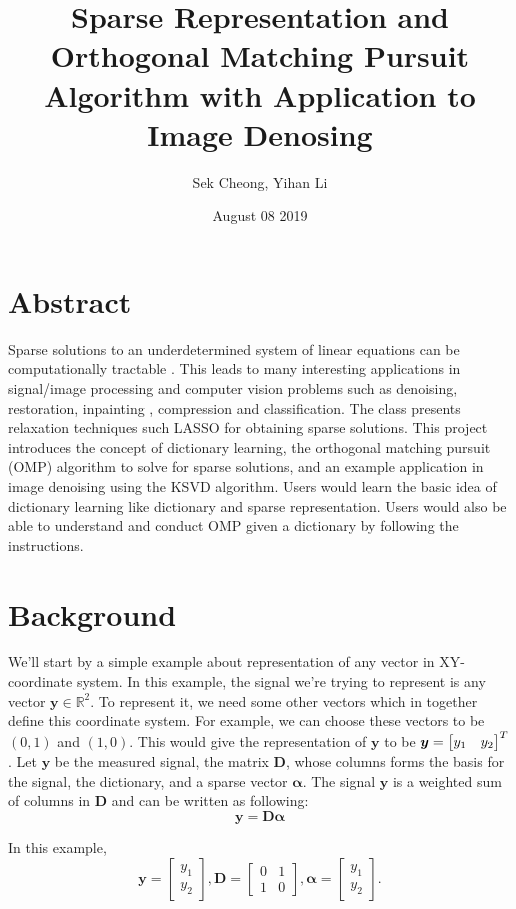\documentclass[12pt,letterpaper]{article}
\title{Sparse Representation and Orthogonal Matching Pursuit Algorithm with Application to Image Denosing}
\author{Sek Cheong, Yihan Li}
\date{August 08 2019}
\begin{document}
\maketitle

\section*{Abstract}
Sparse solutions to an underdetermined system of linear equations can be computationally tractable \cite{Elad2010SparseModeling}. This leads to many interesting applications in signal/image processing and computer vision problems such as denoising\cite{EladAharon2006}, restoration, inpainting \cite{ShenHu2009}, compression and classification. The class presents relaxation techniques such LASSO for obtaining sparse solutions. This project introduces the concept of dictionary learning, the orthogonal matching pursuit (OMP) algorithm to solve for sparse solutions, and an example application in image denoising using the KSVD algorithm. Users would learn the basic idea of dictionary learning like dictionary and sparse representation. Users would also be able to understand and conduct OMP given a dictionary by following the instructions. 
\pagebreak
\section*{Background}
We'll start by a simple example about representation of any vector in XY-coordinate system. In this example, the signal we're trying to represent is any vector $\bm{y}\in\mathbb{R}^2$. To represent it, we need some other vectors which in together define this coordinate system. For example, we can choose these vectors to be $(0,1)$ and $(1,0)$. This would give the representation of $\bm{y}$ to be
$\bm{y}=\mqty[ 
y_1 & y_2]^T$. Let $\bm{y}$ be the measured signal, the matrix $\bm{D}$, whose columns  forms the basis for the signal, the dictionary, and a sparse vector $\bm{\alpha}$. The signal $\bm{y}$ is a weighted sum of columns in $\bm{D}$ and can be written as following:
\[
    \bm{y} = \bm{D}\bm{\alpha} 
\]

In this example, 
\[
\bm{y}=\begin{bmatrix} 
y_1 \\
y_2 
\end{bmatrix},  \bm{D}=\begin{bmatrix} 
0 & 1 \\
1 & 0 
\end{bmatrix}, \bm{\alpha}=\begin{bmatrix} 
y_1 \\
y_2 
\end{bmatrix}.
\]
\end{document}
